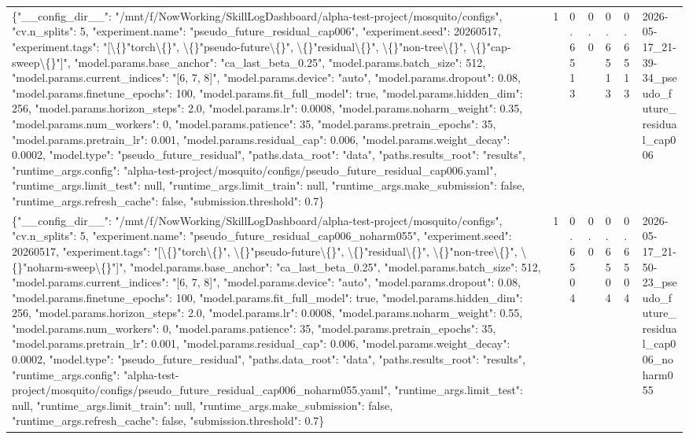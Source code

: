 \begin{tabular}{lllllll}
\{"\_\_config\_dir\_\_": "/mnt/f/NowWorking/SkillLogDashboard/alpha-test-project/mosquito/configs", "cv.n\_splits": 5, "experiment.name": "pseudo\_future\_residual\_cap006", "experiment.seed": 20260517, "experiment.tags": "[\textbackslash\{\}"torch\textbackslash\{\}", \textbackslash\{\}"pseudo-future\textbackslash\{\}", \textbackslash\{\}"residual\textbackslash\{\}", \textbackslash\{\}"non-tree\textbackslash\{\}", \textbackslash\{\}"cap-sweep\textbackslash\{\}"]", "model.params.base\_anchor": "ca\_last\_beta\_0.25", "model.params.batch\_size": 512, "model.params.current\_indices": "[6, 7, 8]", "model.params.device": "auto", "model.params.dropout": 0.08, "model.params.finetune\_epochs": 100, "model.params.fit\_full\_model": true, "model.params.hidden\_dim": 256, "model.params.horizon\_steps": 2.0, "model.params.lr": 0.0008, "model.params.noharm\_weight": 0.35, "model.params.num\_workers": 0, "model.params.patience": 35, "model.params.pretrain\_epochs": 35, "model.params.pretrain\_lr": 0.001, "model.params.residual\_cap": 0.006, "model.params.weight\_decay": 0.0002, "model.type": "pseudo\_future\_residual", "paths.data\_root": "data", "paths.results\_root": "results", "runtime\_args.config": "alpha-test-project/mosquito/configs/pseudo\_future\_residual\_cap006.yaml", "runtime\_args.limit\_test": null, "runtime\_args.limit\_train": null, "runtime\_args.make\_submission": false, "runtime\_args.refresh\_cache": false, "submission.threshold": 0.7\} & 1 & 0.6513 & 0.0 & 0.6513 & 0.6513 & 2026-05-17\_21-39-34\_pseudo\_future\_residual\_cap006 \\
\{"\_\_config\_dir\_\_": "/mnt/f/NowWorking/SkillLogDashboard/alpha-test-project/mosquito/configs", "cv.n\_splits": 5, "experiment.name": "pseudo\_future\_residual\_cap006\_noharm055", "experiment.seed": 20260517, "experiment.tags": "[\textbackslash\{\}"torch\textbackslash\{\}", \textbackslash\{\}"pseudo-future\textbackslash\{\}", \textbackslash\{\}"residual\textbackslash\{\}", \textbackslash\{\}"non-tree\textbackslash\{\}", \textbackslash\{\}"noharm-sweep\textbackslash\{\}"]", "model.params.base\_anchor": "ca\_last\_beta\_0.25", "model.params.batch\_size": 512, "model.params.current\_indices": "[6, 7, 8]", "model.params.device": "auto", "model.params.dropout": 0.08, "model.params.finetune\_epochs": 100, "model.params.fit\_full\_model": true, "model.params.hidden\_dim": 256, "model.params.horizon\_steps": 2.0, "model.params.lr": 0.0008, "model.params.noharm\_weight": 0.55, "model.params.num\_workers": 0, "model.params.patience": 35, "model.params.pretrain\_epochs": 35, "model.params.pretrain\_lr": 0.001, "model.params.residual\_cap": 0.006, "model.params.weight\_decay": 0.0002, "model.type": "pseudo\_future\_residual", "paths.data\_root": "data", "paths.results\_root": "results", "runtime\_args.config": "alpha-test-project/mosquito/configs/pseudo\_future\_residual\_cap006\_noharm055.yaml", "runtime\_args.limit\_test": null, "runtime\_args.limit\_train": null, "runtime\_args.make\_submission": false, "runtime\_args.refresh\_cache": false, "submission.threshold": 0.7\} & 1 & 0.6504 & 0.0 & 0.6504 & 0.6504 & 2026-05-17\_21-50-23\_pseudo\_future\_residual\_cap006\_noharm055 \\

\end{tabular}
